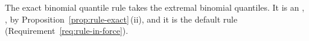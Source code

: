 
The exact binomial quantile rule takes the extremal binomial quantiles. It is an
, , by
Proposition~\ref{prop:rule-exact}\,(ii), and it is the default rule
(Requirement~\ref{req:rule-in-force}).

